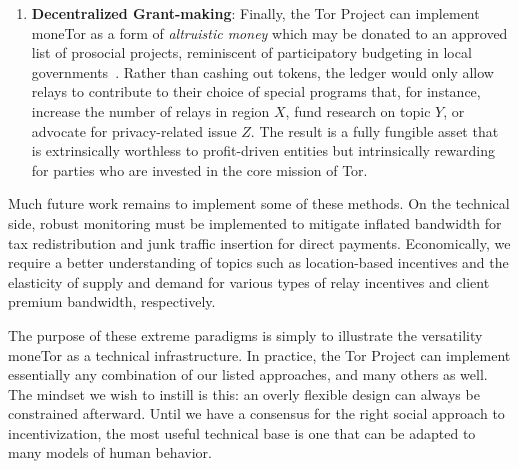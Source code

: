\begin{enumerate}
\item \textbf{Decentralized Grant-making}: Finally, the Tor Project can
implement moneTor as a form of \emph{altruistic money} which may be donated to
an approved list of prosocial projects, reminiscent of participatory budgeting
in local governments~\cite{cabannes2004participatory}. Rather than cashing out
tokens, the ledger would only allow relays to contribute to their choice of
special programs that, for instance, increase the number of relays in region
$X$, fund research on topic $Y$, or advocate for privacy-related issue $Z$.
The result is a fully fungible asset that is extrinsically worthless to
profit-driven entities but intrinsically rewarding for parties who are invested
in the core mission of Tor.

\end{enumerate}

Much future work remains to implement some of these methods. On the technical
side, robust monitoring must be implemented to mitigate inflated bandwidth for
tax redistribution and junk traffic insertion for direct payments. Economically,
we require a better understanding of topics such as location-based incentives
and the elasticity of supply and demand for various types of relay incentives
and client premium bandwidth, respectively.

The purpose of these extreme paradigms is simply to illustrate the versatility
moneTor as a technical infrastructure. In practice, the Tor Project can
implement essentially any combination of our listed approaches, and many others
as well. The mindset we wish to instill is this: an overly flexible design can
always be constrained afterward. Until we have a consensus for the right social
approach to incentivization, the most useful technical base is one that can be
adapted to many models of human behavior.

